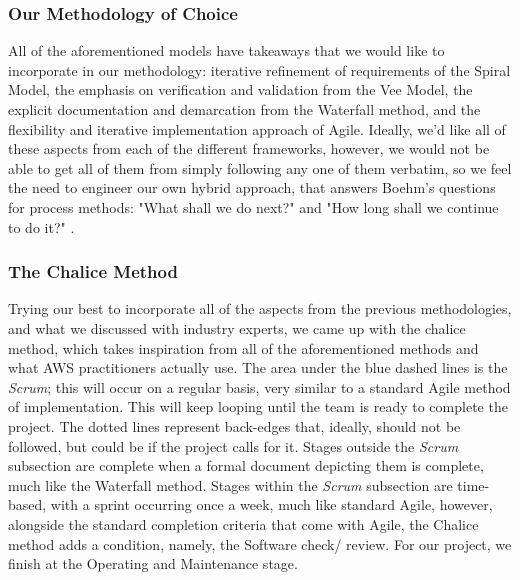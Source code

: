 \subsubsection{Our Methodology of Choice}

All of the aforementioned models have takeaways that we would like to incorporate in our methodology: iterative refinement of requirements of the Spiral Model, the emphasis on verification and validation from the Vee Model, the explicit documentation and demarcation from the Waterfall method, and the flexibility and iterative implementation approach of Agile. Ideally, we'd like all of these aspects from each of the different frameworks, however, we would not be able to get all of them from simply following any one of them verbatim, so we feel the need to engineer our own hybrid approach, that answers Boehm's questions for process methods: "What shall we do next?" and "How long shall we continue to do it?" \cite[p. 61]{spiralmode;}.

\subsubsection{The Chalice Method}



Trying our best to incorporate all of the aspects from the previous methodologies, and what we discussed with industry experts, we came up with the chalice method, which takes inspiration from all of the aforementioned methods and what AWS practitioners actually use. The area under the blue dashed lines is the \textit{Scrum}; this will occur on a regular basis, very similar to a standard Agile method of implementation. This will keep looping until the team is ready to complete the project. The dotted lines represent back-edges that, ideally, should not be followed, but could be if the project calls for it. Stages outside the \textit{Scrum} subsection are complete when a formal document depicting them is complete, much like the Waterfall method. Stages within the \textit{Scrum} subsection are time-based, with a sprint occurring once a week, much like standard Agile, however, alongside the standard completion criteria that come with Agile, the Chalice method adds a condition, namely, the Software check/ review. For our project, we finish at the Operating and Maintenance stage.


